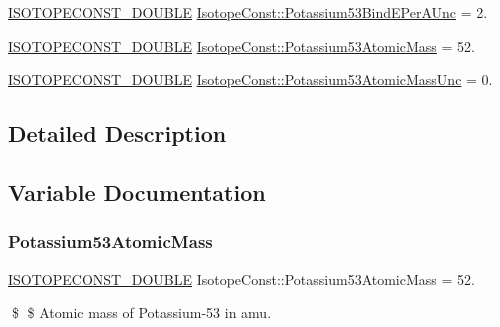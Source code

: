\begin{DoxyCompactItemize}
\mbox{\hyperlink{group___isotope_const-_macros_ga8f45a7272ce02c0b4c65c44636ed719a}{I\+S\+O\+T\+O\+P\+E\+C\+O\+N\+S\+T\+\_\+\+D\+O\+U\+B\+LE}} \mbox{\hyperlink{group___isotope_const-_potassium-_k53_ga4c7206a7f310cde0ee1bf47e2223dea5}{Isotope\+Const\+::\+Potassium53\+Bind\+E\+Per\+A\+Unc}} = 2.
\item 
\mbox{\hyperlink{group___isotope_const-_macros_ga8f45a7272ce02c0b4c65c44636ed719a}{I\+S\+O\+T\+O\+P\+E\+C\+O\+N\+S\+T\+\_\+\+D\+O\+U\+B\+LE}} \mbox{\hyperlink{group___isotope_const-_potassium-_k53_ga7957e75989fea006630ed7a0a6b713ef}{Isotope\+Const\+::\+Potassium53\+Atomic\+Mass}} = 52.
\item 
\mbox{\hyperlink{group___isotope_const-_macros_ga8f45a7272ce02c0b4c65c44636ed719a}{I\+S\+O\+T\+O\+P\+E\+C\+O\+N\+S\+T\+\_\+\+D\+O\+U\+B\+LE}} \mbox{\hyperlink{group___isotope_const-_potassium-_k53_ga99ea6fb40049c5886f7fdfaf341db749}{Isotope\+Const\+::\+Potassium53\+Atomic\+Mass\+Unc}} = 0.
\end{DoxyCompactItemize}


\subsection{Detailed Description}


\subsection{Variable Documentation}
\mbox{\label{group___isotope_const-_potassium-_k53_ga7957e75989fea006630ed7a0a6b713ef}} 
\subsubsection{\texorpdfstring{Potassium53\+Atomic\+Mass}{Potassium53AtomicMass}}
{\footnotesize\ttfamily \mbox{\hyperlink{group___isotope_const-_macros_ga8f45a7272ce02c0b4c65c44636ed719a}{I\+S\+O\+T\+O\+P\+E\+C\+O\+N\+S\+T\+\_\+\+D\+O\+U\+B\+LE}} Isotope\+Const\+::\+Potassium53\+Atomic\+Mass = 52.}

\$ \$ Atomic mass of Potassium-\/53 in amu. \mbox{\label{group___isotope_const-_potassium-_k53_ga99ea6fb40049c5886f7fdfaf341db749}} 
